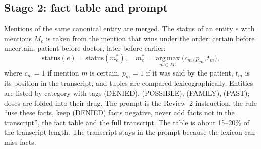 \documentclass[conference]{IEEEtran}
\begin{document}
\subsection{Stage 2: fact table and prompt}
Mentions of the same canonical entity are merged. The status of an entity $e$ with mentions $M_e$ is taken
from the mention that wins under the order: certain before uncertain, patient before doctor, later before
earlier:
\begin{equation}
\text{status}(e) = \text{status}(m^*_e),\quad
m^*_e = \operatorname*{arg\,max}_{m \in M_e} \big(c_m, p_m, t_m\big),
\end{equation}
where $c_m=1$ if mention $m$ is certain, $p_m=1$ if it was said by the patient, $t_m$ is its position in
the transcript, and tuples are compared lexicographically. Entities are listed by category with tags (DENIED), (POSSIBLE), (FAMILY),
(PAST); doses are folded into their drug. The prompt is the Review~2 instruction, the rule ``use these facts,
keep (DENIED) facts negative, never add facts not in the transcript'', the fact table and the full
transcript. The table is about 15--20\% of the transcript length. The transcript stays in the prompt because
the lexicon can miss facts.
\end{document}
